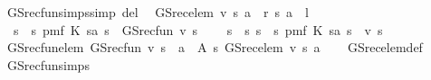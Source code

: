 \begin{isabellebody}
\ GS{\isacharunderscore}{\kern0pt}rec{\isacharunderscore}{\kern0pt}fun{\isachardot}{\kern0pt}simps{\isacharbrackleft}{\kern0pt}simp\ del{\isacharbrackright}{\kern0pt}\ \isanewline
\isanewline
{}\isamarkupfalse%
\ {\isachardoublequoteopen}GS{\isacharunderscore}{\kern0pt}rec{\isacharunderscore}{\kern0pt}elem\ v\ s\ a\ {\isacharequal}{\kern0pt}\ r\ {\isacharparenleft}{\kern0pt}s{\isacharcomma}{\kern0pt}\ a{\isacharparenright}{\kern0pt}\ {\isacharplus}{\kern0pt}\ l\ {\isacharasterisk}{\kern0pt}\ {\isacharparenleft}{\kern0pt}\isanewline
\ \ {\isacharparenleft}{\kern0pt}{\isasymSum}s{\isacharprime}{\kern0pt}\ {\isacharless}{\kern0pt}\ s{\isachardot}{\kern0pt}\ pmf\ {\isacharparenleft}{\kern0pt}K\ {\isacharparenleft}{\kern0pt}s{\isacharcomma}{\kern0pt}a{\isacharparenright}{\kern0pt}{\isacharparenright}{\kern0pt}\ s{\isacharprime}{\kern0pt}\ {\isacharasterisk}{\kern0pt}\ {\isacharparenleft}{\kern0pt}GS{\isacharunderscore}{\kern0pt}rec{\isacharunderscore}{\kern0pt}fun\ v\ s{\isacharprime}{\kern0pt}{\isacharparenright}{\kern0pt}{\isacharparenright}{\kern0pt}\ {\isacharplus}{\kern0pt}\ \isanewline
\ \ {\isacharparenleft}{\kern0pt}{\isasymSum}s{\isacharprime}{\kern0pt}\ {\isasymin}\ {\isacharbraceleft}{\kern0pt}s{\isacharprime}{\kern0pt}{\isachardot}{\kern0pt}\ s\ {\isasymle}\ s{\isacharprime}{\kern0pt}{\isacharbraceright}{\kern0pt}{\isachardot}{\kern0pt}\ pmf\ {\isacharparenleft}{\kern0pt}K\ {\isacharparenleft}{\kern0pt}s{\isacharcomma}{\kern0pt}a{\isacharparenright}{\kern0pt}{\isacharparenright}{\kern0pt}\ s{\isacharprime}{\kern0pt}\ {\isacharasterisk}{\kern0pt}\ v\ s{\isacharprime}{\kern0pt}{\isacharparenright}{\kern0pt}{\isacharparenright}{\kern0pt}{\isachardoublequoteclose}\isanewline
\isanewline
{}\isamarkupfalse%
\ GS{\isacharunderscore}{\kern0pt}rec{\isacharunderscore}{\kern0pt}fun{\isacharunderscore}{\kern0pt}elem{\isacharcolon}{\kern0pt}\ {\isachardoublequoteopen}GS{\isacharunderscore}{\kern0pt}rec{\isacharunderscore}{\kern0pt}fun\ v\ s\ {\isacharequal}{\kern0pt}\ {\isacharparenleft}{\kern0pt}{\isasymSqunion}a\ {\isasymin}\ A\ s{\isachardot}{\kern0pt}\ GS{\isacharunderscore}{\kern0pt}rec{\isacharunderscore}{\kern0pt}elem\ v\ s\ a{\isacharparenright}{\kern0pt}{\isachardoublequoteclose}\isanewline
%
\isadelimproof
\ \ %
\endisadelimproof
%
\isatagproof
{}\isamarkupfalse%
\ GS{\isacharunderscore}{\kern0pt}rec{\isacharunderscore}{\kern0pt}elem{\isacharunderscore}{\kern0pt}def\isanewline
\ \ \isamarkupfalse%
\ GS{\isacharunderscore}{\kern0pt}rec{\isacharunderscore}{\kern0pt}fun{\isachardot}{\kern0pt}simps\ \isanewline

\end{isabellebody}

